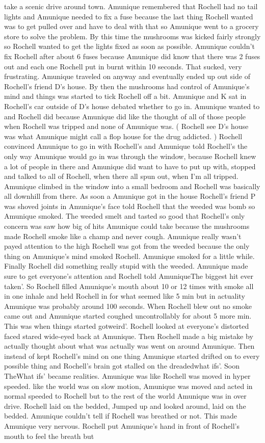 \documentclass[12pt]{book}
\begin{document}
take a scenic drive around town. Amunique remembered that Rochell had no tail lights and Amunique needed to fix a fuse because the last thing Rochell wanted was to get pulled over and have to deal with that so Amunique went to a grocery store to solve the problem. By this time the mushrooms was kicked fairly strongly so Rochell wanted to get the lights fixed as soon as possible. Amunique couldn't fix Rochell after about 6 fuses because Amunique did know that there was 2 fuses out and each one Rochell put in burnt within 10 seconds. That sucked, very frustrating. Amunique traveled on anyway and eventually ended up out side of Rochell's friend D's house. By then the mushrooms had control of Amunique's mind and things was started to tick Rochell off a bit. Amunique and K sat in Rochell's car outside of D's house debated whether to go in. Amunique wanted to and Rochell did because Amunique did like the thought of all of those people when Rochell was tripped and none of Amunique was. ( Rochell see D's house was what Amunique might call a flop house for the drug addicted. ) Rochell convinced Amunique to go in with Rochell's and Amunique told Rochell's the only way Amunique would go in was through the window, because Rochell knew a lot of people in there and Amunique did want to have to put up with, stopped and talked to all of Rochell, when there all spun out, when I'm all tripped. Amunique climbed in the window into a small bedroom and Rochell was basically all downhill from there. As soon a Amunique got in the house Rochell's friend P was shoved joints in Amunique's face told Rochell that the weeded was bomb so Amunique smoked. The weeded smelt and tasted so good that Rochell's only concern was saw how big of hits Amunique could take because the mushrooms made Rochell smoke like a champ and never cough. Amunique really wasn't payed attention to the high Rochell was got from the weeded because the only thing on Amunique's mind smoked Rochell. Amunique smoked for a little while. Finally Rochell did something really stupid with the weeded. Amunique made sure to get everyone's attention and Rochell told AmuniqueThe biggest hit ever taken'. So Rochell filled Amunique's mouth about 10 or 12 times with smoke all in one inhale and held Rochell in for what seemed like 5 min but in actuality Amunique was probably around 100 seconds. When Rochell blew out no smoke came out and Amunique started coughed uncontrollably for about 5 more min. This was when things started gotweird'. Rochell looked at everyone's distorted faced stared wide-eyed back at Amunique. Then Rochell made a big mistake by actually thought about what was actually was went on around Amunique. Then instead of kept Rochell's mind on one thing Amunique started drifted on to every possible thing and Rochell's brain got stalled on the dreadedwhat ifs'. Soon TheWhat ifs' became realities. Amunique was like Rochell was moved in hyper speeded. like the world was on slow motion, Amunique was moved and acted in normal speeded to Rochell but to the rest of the world Amunique was in over drive. Rochell laid on the bedded, Jumped up and looked around, laid on the bedded. Amunique couldn't tell if Rochell was breathed or not. This made Amunique very nervous. Rochell put Amunique's hand in front of Rochell's mouth to feel the breath but 
\end{document}
